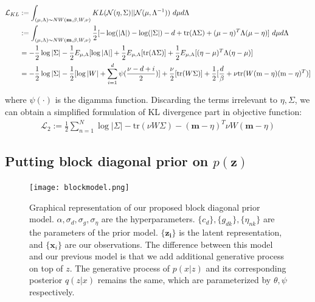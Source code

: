 \begin{align}
\notag \mathcal{L}_{KL} &:= \int_{(\mu, \Lambda)\sim NW(\mathbf{m}, \beta, W, \nu)} KL(\mathcal{N}(\eta, \Sigma)||\mathcal{N}(\mu, \Lambda^{-1})) \ d\mu d\Lambda \\
\notag				& :=  \int_{(\mu, \Lambda)\sim NW(\mathbf{m}, \beta, W, \nu)}  \frac{1}{2}[-\log(|\Lambda|) - \log(|\Sigma|) -d + \mbox{tr}(\Lambda\Sigma) + (\mu-\eta)^T\Lambda(\mu-\eta)]\ d\mu d\Lambda \\
\notag				& = -\frac{1}{2}\log|\Sigma| - \frac{1}{2}E_{\mu, \Lambda}[\log |\Lambda|] + \frac{1}{2}E_{\mu, \Lambda} [\mbox{tr}(\Lambda\Sigma)] + \frac{1}{2} E_{\mu, \Lambda}[(\eta-\mu)^T\Lambda(\eta-\mu)]\\
\notag				& = -\frac{1}{2}\log|\Sigma| - \frac{1}{2}[\log |W| + \sum_{i=1}^{d}\psi(\frac{\nu-d+i}{2})] + \frac{\nu}{2}[\mbox{tr}(W\Sigma)] + \frac{1}{2} [\frac{d}{\beta} + \nu \mbox{tr}(W(\mbox{m}-\eta)(\mbox{m}-\eta)^T)]
\end{align}

where $\psi(\cdot)$ is the digamma function. Discarding the terms irrelevant to $\eta, \Sigma$, we can obtain a simplified formulation of KL divergence part in objective function:
\begin{align}
\label{KLW} \mathcal{L}_2 := \frac{1}{2} \sum_{n=1}^{N} \log|\Sigma| - \mbox{tr}(\nu W \Sigma ) - (\mathbf{m}-\eta)^T \nu W (\mathbf{m}-\eta)
\end{align}





\subsection{Putting block diagonal prior on $p(\mathbf{z})$}

\begin{figure}[hb]
  \centering
  \texttt{[image: blockmodel.png]}
  \caption[]
   {Graphical representation of our proposed block diagonal prior model. $\alpha, \sigma_d, \sigma_g, \sigma_{\eta}$ are the hyperparameters. $\{c_d\}, \{g_{dk}\}, \{\eta_{nk}\}$ are the parameters of the prior model. $\{\mathbf{z_i}\}$ is the latent representation, and $\{\mathbf{x}_i\}$ are our observations. The difference between this model and our previous model is that we add additional generative process on top of $z$. The generative process of $p(x|z)$ and its corresponding posterior $q(z|x)$ remains the same, which are parameterized by $\theta, \psi$ respectively.}
\end{figure}


